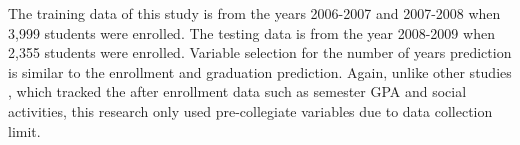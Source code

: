 \documentclass[12pt,english]{report}
\begin{document}
The training data of this study is from the years 2006-2007 and 2007-2008 when 3,999 students were enrolled. The testing data is from the year 2008-2009 when 2,355 students were enrolled. %
Variable selection for the number of years prediction is similar to the enrollment and graduation prediction. Again, unlike other studies \citep{Lin2009, deberard2004predictors, dekker2009}, which tracked the after enrollment data such as semester GPA and social activities, this research only used pre-collegiate variables due to data collection limit.

\end{document}
